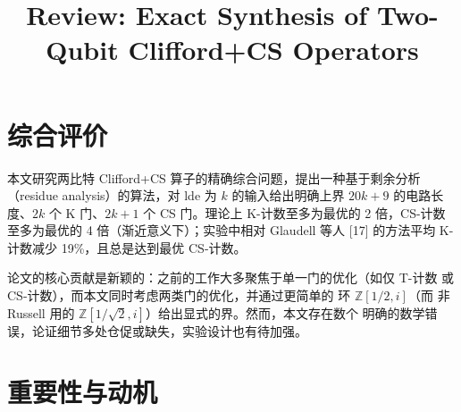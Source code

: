 \documentclass[10pt,a4paper]{article}
\title{Review: Exact Synthesis of Two-Qubit Clifford+CS Operators}
\date{}
\newcommand{\reviewnote}[1]{%
  \marginpar{\raggedright\footnotesize\textsf{#1}}%
}
\newcommand{\reviewernote}[1]{%
  \marginpar{\raggedright\footnotesize\textsf{[R] #1}}%
}
\newcommand{\authorresponse}[1]{%
  \marginpar{\raggedright\footnotesize\textsf{[A] #1}}%
}
\newcommand{\question}[1]{%
  \marginpar{\raggedright\footnotesize\textsf{[?] #1}}%
}
\newcommand{\inlinenote}[1]{%
  \noindent\fbox{\parbox{\dimexpr\textwidth-2\fboxsep-2\fboxrule}{%
    \footnotesize\textsf{#1}%
  }}\par\medskip
}
\def\tfrac#1#2{#1/#2}%
\begin{document}
\maketitle

%
%
%
%
%

\section{综合评价}
 
本文研究两比特 Clifford+CS 算子的精确综合问题，提出一种基于剩余分析（residue analysis）的算法，对 lde 为 $k$ 的输入给出明确上界 $20k+9$ 的电路长度、$2k$ 个 K 门、$2k+1$ 个 CS 门。理论上 K-计数至多为最优的 2 倍，CS-计数至多为最优的 4 倍（渐近意义下）；实验中相对 Glaudell 等人 [17] 的方法平均 K-计数减少 19\%，且总是达到最优 CS-计数。
 
论文的核心贡献是新颖的：之前的工作大多聚焦于单一门的优化（如仅 T-计数
或 CS-计数），而本文同时考虑两类门的优化，并通过更简单的
环 $\mathbb{Z}[\tfrac{1}{2}, i]$（而
非 Russell 用的
$\mathbb{Z}[\tfrac{1}{\sqrt{2}}, i]$）给出显式的界。然而，本文存在数个
明确的数学错误，论证细节多处仓促或缺失，实验设计也有待加强。



\section{重要性与动机}
 
\end{document}
